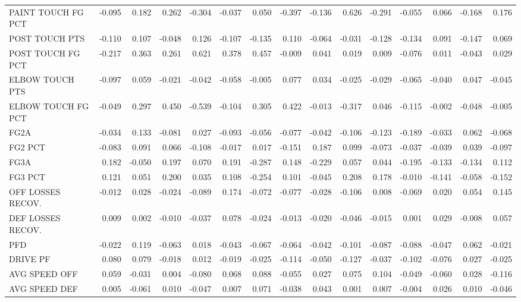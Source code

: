 \begin{tabular}{lrrrrrrrrrrrrrr}
PAINT TOUCH FG PCT & -0.095 & 0.182 & 0.262 & -0.304 & -0.037 & 0.050 & -0.397 & -0.136 & 0.626 & -0.291 & -0.055 & 0.066 & -0.168 & 0.176 \\
POST TOUCH PTS & -0.110 & 0.107 & -0.048 & 0.126 & -0.107 & -0.135 & 0.110 & -0.064 & -0.031 & -0.128 & -0.134 & 0.091 & -0.147 & 0.069 \\
POST TOUCH FG PCT & -0.217 & 0.363 & 0.261 & 0.621 & 0.378 & 0.457 & -0.009 & 0.041 & 0.019 & 0.009 & -0.076 & 0.011 & -0.043 & 0.029 \\
ELBOW TOUCH PTS & -0.097 & 0.059 & -0.021 & -0.042 & -0.058 & -0.005 & 0.077 & 0.034 & -0.025 & -0.029 & -0.065 & -0.040 & 0.047 & -0.045 \\
ELBOW TOUCH FG PCT & -0.049 & 0.297 & 0.450 & -0.539 & -0.104 & 0.305 & 0.422 & -0.013 & -0.317 & 0.046 & -0.115 & -0.002 & -0.048 & -0.005 \\
FG2A & -0.034 & 0.133 & -0.081 & 0.027 & -0.093 & -0.056 & -0.077 & -0.042 & -0.106 & -0.123 & -0.189 & -0.033 & 0.062 & -0.068 \\
FG2 PCT & -0.083 & 0.091 & 0.066 & -0.108 & -0.017 & 0.017 & -0.151 & 0.187 & 0.099 & -0.073 & -0.037 & -0.039 & 0.039 & -0.097 \\
FG3A & 0.182 & -0.050 & 0.197 & 0.070 & 0.191 & -0.287 & 0.148 & -0.229 & 0.057 & 0.044 & -0.195 & -0.133 & -0.134 & 0.112 \\
FG3 PCT & 0.121 & 0.051 & 0.200 & 0.035 & 0.108 & -0.254 & 0.101 & -0.045 & 0.208 & 0.178 & -0.010 & -0.141 & -0.058 & -0.152 \\
OFF LOSSES RECOV. & -0.012 & 0.028 & -0.024 & -0.089 & 0.174 & -0.072 & -0.077 & -0.028 & -0.106 & 0.008 & -0.069 & 0.020 & 0.054 & 0.145 \\
DEF LOSSES RECOV. & 0.009 & 0.002 & -0.010 & -0.037 & 0.078 & -0.024 & -0.013 & -0.020 & -0.046 & -0.015 & 0.001 & 0.029 & -0.008 & 0.057 \\
PFD & -0.022 & 0.119 & -0.063 & 0.018 & -0.043 & -0.067 & -0.064 & -0.042 & -0.101 & -0.087 & -0.088 & -0.047 & 0.062 & -0.021 \\
DRIVE PF & 0.080 & 0.079 & -0.018 & 0.012 & -0.019 & -0.025 & -0.114 & -0.050 & -0.127 & -0.037 & -0.102 & -0.076 & 0.027 & -0.025 \\
AVG SPEED OFF & 0.059 & -0.031 & 0.004 & -0.080 & 0.068 & 0.088 & -0.055 & 0.027 & 0.075 & 0.104 & -0.049 & -0.060 & 0.028 & -0.116 \\
AVG SPEED DEF & 0.005 & -0.061 & 0.010 & -0.047 & 0.007 & 0.071 & -0.038 & 0.043 & 0.001 & 0.007 & -0.004 & 0.026 & 0.010 & -0.046 \\

\end{tabular}
